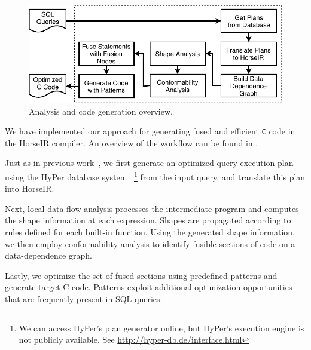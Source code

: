 \begin{figure}[htbp]
\centering
\includegraphics[width=\columnwidth]{./src/figure/overview-v4.pdf}
\caption{Analysis and code generation overview.} \label{fig:overview}
\end{figure}

We have implemented our approach for generating fused and efficient
\texttt{C} code in the HorseIR compiler. An overview of the workflow
can be found in .

Just as in previous work~\OldPaper, we first generate an optimized
query execution plan using the HyPer database system~\cite{Neumann2011:HyPer}
\footnote{We can access HyPer's plan generator online, but HyPer's execution
engine is not publicly available.  See \url{http://hyper-db.de/interface.html}}
from the input query, and translate this plan into HorseIR.

Next, local data-flow analysis processes the intermediate program and
computes the shape information at each expression. Shapes are propagated
according to rules defined for each built-in function. Using the
generated shape information, we then employ conformability analysis to
identify fusible sections of code on a data-dependence graph.

Lastly, we optimize the set of fused sections using predefined patterns
and generate target C code. Patterns exploit additional optimization
opportunities that are frequently present in SQL queries.

